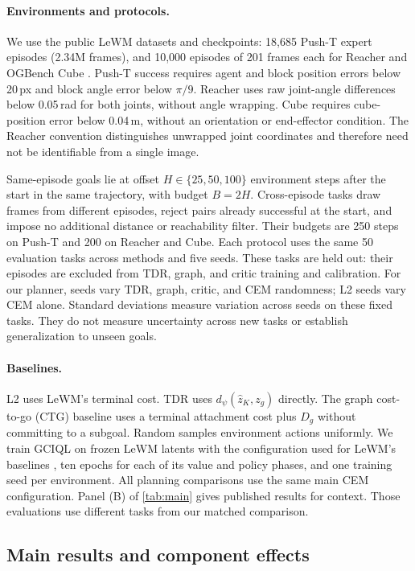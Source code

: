 \documentclass{article} %
\newcommand{\dd}{d_{\psi}}
\theoremstyle{definition}
\theoremstyle{remark}
\begin{document}
\paragraph{Environments and protocols.}
We use the public LeWM datasets and checkpoints: 18,685 Push-T expert episodes
(2.34M frames), and 10,000 episodes of 201 frames each for Reacher and OGBench Cube
\citep{lewm,ogbench}. Push-T success requires agent and block position errors below
20\,px and block angle error below $\pi/9$. Reacher uses raw joint-angle differences
below 0.05\,rad for both joints, without angle wrapping. Cube requires cube-position
error below 0.04\,m, without an orientation or end-effector condition.
The Reacher convention distinguishes unwrapped joint coordinates and therefore need not
be identifiable from a single image.

Same-episode goals lie at offset $H\in\{25,50,100\}$ environment steps after the start
in the same trajectory, with budget $B=2H$. Cross-episode tasks draw frames from different episodes, reject
pairs already successful at the start, and impose no additional distance or reachability
filter. Their budgets are 250 steps on Push-T and 200 on Reacher and Cube.
Each protocol uses the same 50 evaluation tasks across methods and five seeds. These tasks are
held out: their episodes are excluded from TDR, graph, and critic training and calibration.
For our planner, seeds vary TDR, graph, critic, and CEM randomness; L2 seeds vary
CEM alone. Standard deviations measure variation across seeds on these fixed tasks.
They do not measure uncertainty across new tasks or establish generalization to unseen goals.

\paragraph{Baselines.}
L2 uses LeWM's terminal cost. TDR uses $\dd(\hat z_K,z_g)$ directly.
The graph cost-to-go (CTG) baseline uses a terminal attachment cost plus $D_g$ without
committing to a subgoal. Random samples environment actions uniformly.
We train GCIQL \citep{iql,ogbench} on frozen LeWM
latents with the configuration used for LeWM's baselines \citep{stableworldmodel}, ten epochs for
each of its value and policy phases, and one training seed per environment.
All planning comparisons use the same main CEM configuration.
Panel (B) of \cref{tab:main} gives published results for context.
Those evaluations use different tasks from our matched comparison.


\subsection{Main results and component effects}
\label{sec:main}
\end{document}
